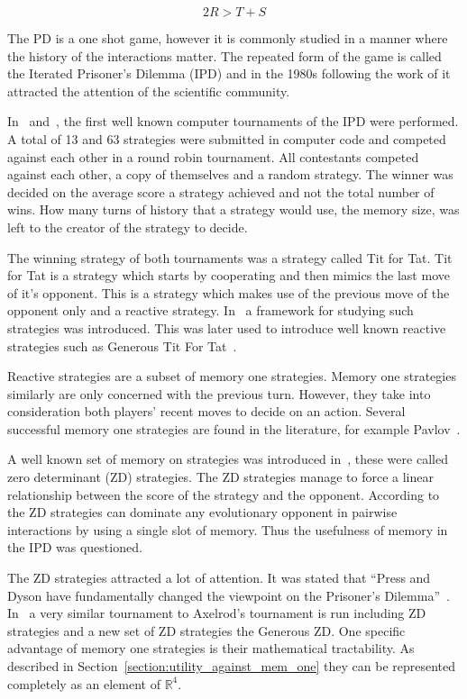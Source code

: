 \documentclass[10pt]{article}
\newcommand{\R}{\mathbb{R}}
\begin{document}
\begin{equation}\label{eq:pd_constrain_two}
    2R > T + S
\end{equation}

The PD is a one shot game, however it is commonly studied in a manner where the
history of the interactions matter. The repeated form of the game is called the
Iterated Prisoner's Dilemma (IPD) and in the 1980s following the work of
\cite{Axelrod1980a, Axelrod1980b} it attracted the attention of the scientific
community.

In~\cite{Axelrod1980a} and~\cite{Axelrod1980b}, the first well known computer
tournaments of the IPD were performed. A total of 13 and 63 strategies were submitted
in computer code and competed against each other in a round robin tournament.
All contestants competed against each other, a copy of themselves and a random strategy.
The winner was decided on the average score a strategy achieved and not the total number
of wins. How many turns of history that a strategy would use, the memory size, was left
to the creator of the strategy to decide.

The winning strategy of both tournaments was a strategy called Tit for Tat. Tit for Tat
is a strategy which starts by cooperating and then mimics the last move of
it's opponent. This is a strategy which makes use of the previous move of the opponent
only and a reactive strategy. In~\cite{Nowak1989} a framework for
studying such strategies was introduced. This was later used to introduce well known
reactive strategies such as Generous Tit For Tat~\cite{Nowak1990}.

Reactive strategies are a subset of memory one strategies. Memory one strategies
similarly are only concerned with the previous turn. However, they take into consideration
both players' recent moves to decide on an action. Several successful memory one
strategies are found in the literature, for example Pavlov~\cite{Nowak1993}.

A well known set of memory on strategies was introduced in~\cite{Press2012},
these were called zero determinant (ZD) strategies. The ZD strategies manage to force a linear
relationship between the score of the strategy and the opponent. According to~\cite{Press2012}
the ZD strategies can dominate any evolutionary opponent in pairwise
interactions by using a single slot of memory. Thus the usefulness of memory in
the IPD was questioned.

The ZD strategies attracted a lot of attention. It was stated that
``Press and Dyson have fundamentally changed the viewpoint on the Prisoner's
Dilemma''~\cite{Stewart2012}. In~\cite{Stewart2012} a very similar tournament to Axelrod's
tournament is run including ZD strategies and a new set of ZD strategies the Generous
ZD. One specific advantage of memory one strategies is their mathematical tractability.
As described in Section~\ref{section:utility_against_mem_one}
they can be represented completely as an element of \(\R^{4}\).
\end{document}
